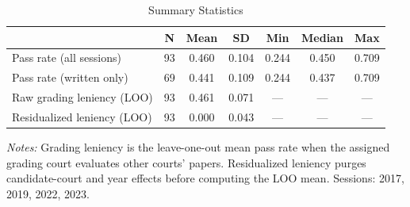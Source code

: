 \begin{table}[htbp]
\centering
\caption{Summary Statistics}
\label{tab:summary}
\begin{tabular}{lcccccc}
\toprule
& N & Mean & SD & Min & Median & Max \\
\midrule
Pass rate (all sessions) & 93 & 0.460 & 0.104 & 0.244 & 0.450 & 0.709 \\
Pass rate (written only) & 69 & 0.441 & 0.109 & 0.244 & 0.437 & 0.709 \\
Raw grading leniency (LOO) & 93 & 0.461 & 0.071 & --- & --- & --- \\
Residualized leniency (LOO) & 93 & 0.000 & 0.043 & --- & --- & --- \\
\bottomrule
\end{tabular}
\begin{minipage}{0.9\textwidth}
\footnotesize
\textit{Notes:} Grading leniency is the leave-one-out mean pass rate when the assigned grading court evaluates other courts' papers. Residualized leniency purges candidate-court and year effects before computing the LOO mean. Sessions: 2017, 2019, 2022, 2023.
\end{minipage}
\end{table}
